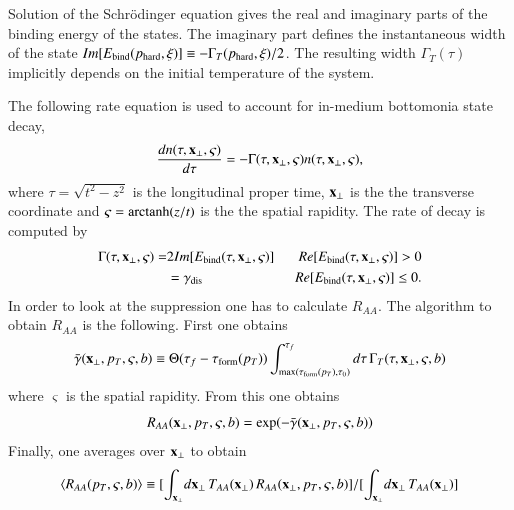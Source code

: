 {Solution of the Schr\"odinger equation gives the real and imaginary parts of 
the binding energy of the states.  The imaginary part defines the instantaneous width of the state
$Im[E_{\rm bind}(p_{\rm hard},\xi)] \equiv -\Gamma_T(p_{\rm hard},\xi)/2$. 
The resulting width $\Gamma_T(\tau)$ implicitly depends on the initial temperature of the
system.

The following rate equation is used to account for in-medium bottomonia state decay,
%
\begin{equation} \label{eq:rate}
\frac{dn(\tau,{\bf x}_\perp,\varsigma)}{d\tau} = -\Gamma(\tau,{\bf x}_\perp,\varsigma)n(\tau,{\bf x}_\perp,\varsigma) ,
\end{equation}
%
where   $\tau = \sqrt{t^{2} - z^{2}}$ is the longitudinal proper time,  ${\bf x}_{\perp}$ is the the transverse coordinate and 
 $\varsigma = {\rm arctanh}(z/t)$ is the the spatial rapidity. The rate of decay is computed by~\cite{Strickland:2011aa}
%
\begin{eqnarray}
\Gamma(\tau, {\bf x}_{\perp}, \varsigma) = 
&2Im[E_{\text{bind}}(\tau, {\bf x}_{\perp}, \varsigma)] & \ \ Re[E_{\text{bind}}(\tau, {\bf x}_{\perp}, \varsigma)] > 0 \\ 
&=\gamma_{\text{dis}} & \ \ Re[E_{\text{bind}}(\tau, {\bf x}_{\perp}, \varsigma)] \leq 0. 
\end{eqnarray}
%
In order to look at the suppression one has to calculate $R_{AA}$. The algorithm to obtain $R_{AA}$ is the following. 
First one obtains 
\begin{equation}
 \bar{\gamma}({\bf x}_\perp,p_T,
\varsigma,b) \equiv \Theta(\tau_f-\tau_{\rm form}(p_T)) \int_{{\rm max}(\tau_{\rm form}(p_T),\tau_0)}^{\tau_f} 
d\tau\,\Gamma_T(\tau,{\bf x}_\perp,\varsigma,b) 
\end{equation}
where $\varsigma$ is the spatial
rapidity.  From this one obtains  
\begin{equation}
R_{AA}({\bf x}_\perp,p_T,\varsigma,b) =%
\exp\!\left(-\bar{\gamma}({\bf x}_\perp,p_T,\varsigma,b) \right)
\end{equation}
  Finally, one averages
over ${\bf x}_\perp$ to obtain 
\begin{equation}
\langle R_{AA}(p_T,\varsigma,b) \rangle \equiv 
[\int_{{\bf x}_\perp} \! d{\bf x}_\perp \, T_{AA}({\bf x}_\perp)\,%
R_{AA}({\bf x}_\perp,p_T,\varsigma,b)]/[\int_{{\bf x}_\perp} \! d{\bf x}_\perp \,%
T_{AA}({\bf x}_\perp)]
\end{equation} 

}
